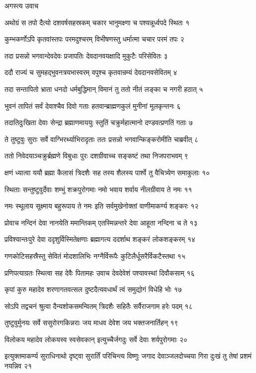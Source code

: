 
अगस्त्य उवाच

अथोग्रं स तपो दैत्यो दशवर्षसहस्रकम्
चकार भानुमक्ष्णा च पश्यन्नूर्ध्वपदे स्थितः १

कुम्भकर्णोऽपि कृतवांस्तपः परमदुश्चरम्
विभीषणस्तु धर्मात्मा चचार परमं तपः २

तदा प्रसन्नो भगवान्देवदेवः प्रजापतिः
देवदानवयक्षादि मुकुटैः परिसेवितः ३

ददौ राज्यं च सुमहद्भुवनत्रयभास्वरम्
वपुश्च कृतवान्रम्यं देवदानवसेवितम् ४

तदा सन्तापितो भ्राता धनदो धर्मबुद्धिमान्
विमानं तु ततो नीतं लङ्का च नगरी हठात् ५

भुवनं तापितं सर्वं देवाश्चैव दिवो गताः
हतवान्ब्राह्मणकुलं मुनीनां मूलकृन्तनः ६

तदातिदुःखिता देवाः सेन्द्रा ब्रह्माणमाययुः
स्तुतिं चक्रुर्महात्मानो दण्डवत्प्रणतिं गताः ७

ते तुष्टुवुः सुराः सर्वे वाग्भिरर्थ्याभिरादृताः
ततः प्रसन्नो भगवान्किङ्करोमीति चाब्रवीत् ८

ततो निवेदयाञ्चक्रुर्ब्रह्मणे विबुधाः पुरः
दशग्रीवाच्च सङ्कष्टं तथा निजपराभवम् ९

क्षणं ध्यात्वा ययौ ब्रह्मा कैलासं त्रिदशैः सह
तस्य शैलस्य पार्श्वे तु वैचित्र्येण समाकुलाः १०

स्थिताः सन्तुष्टुवुर्देवाः शम्भुं शक्रपुरोगमाः
नमो भवाय शर्वाय नीलग्रीवाय ते नमः ११

नमः स्थूलाय सूक्ष्माय बहुरूपाय ते नमः
इति सर्वमुखेनोक्तां वाणीमाकर्ण्य शङ्करः १२

प्रोवाच नन्दिनं देवा नानयेति ममान्तिकम्
एतस्मिन्नन्तरे देवा आहूता नन्दिना च ते १३

प्रविश्यान्तःपुरे देवा ददृशुर्विस्मितेक्षणाः
ब्रह्मागत्य ददर्शाथ शङ्करं लोकशङ्करम् १४

गणकोटिसहस्रैस्तु सेवितं मोदशालिभिः
नग्नैर्विरूपैः कुटिलैर्धूसरैर्विकटैस्तथा १५

प्रणिपत्याग्रतः स्थित्वा सह देवैः पितामहः
उवाच देवदेवेशं पश्यावस्थां दिवौकसाम् १६

कृपां कुरु महादेव शरणागतवत्सल
दुष्टदैत्यवधार्थं त्वं समुद्योगं विधेहि भोः १७

सोऽपि तद्वचनं श्रुत्वा दैन्यशोकसमन्वितम्
त्रिदशैः सहितैः सर्वैराजगाम हरेः पदम् १८

तुष्टुवुर्मुनयः सर्वे ससुरोरगकिन्नराः
जय माधव देवेश जय भक्तजनार्तिहन् १९

विलोकय महादेव लोकयस्व स्वसेवकान्
इत्युच्चैर्जगदुः सर्वे देवाः शर्वपुरोगमाः २०

इत्युक्तमाकर्ण्य सुराधिनाथो दृष्ट्वा सुरार्तिं परिचिन्त्य विष्णुः
जगाद देवाञ्जलदोच्चया गिरा दुःखं तु तेषां प्रशमं नयन्निव २१

